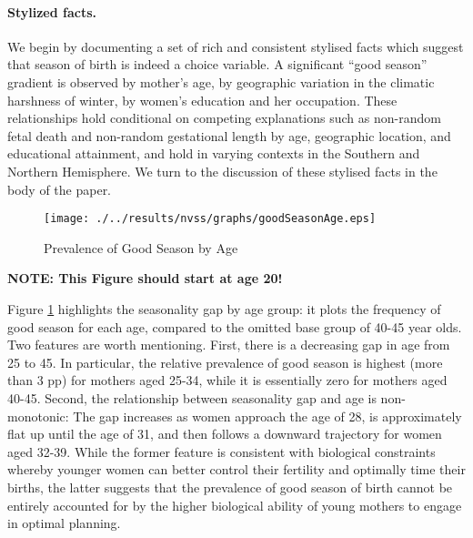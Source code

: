 \documentclass[a4paper, 12 pt]{article}
\theoremstyle{plain}
\begin{document}
\begin{doublespace}
\paragraph{Stylized facts.} We begin by documenting a set of rich and consistent stylised facts which suggest that season of birth is indeed a choice variable.  A significant ``good season'' gradient is observed by mother's age, by geographic variation in the climatic harshness of winter, by women's education and her occupation.  These relationships hold conditional on competing explanations such as non-random fetal death and non-random gestational length by age, geographic location, and educational attainment, and hold in varying contexts in the Southern and Northern Hemisphere.  We turn to the discussion of these stylised facts in the body of the paper.


\begin{figure}[htpb!]
\begin{center}
  \centering
  \caption{Prevalence of Good Season by Age}
  \texttt{[image: ./../results/nvss/graphs/goodSeasonAge.eps]}
  \label{fig:goodByAge}
\end{center}
\vspace{-5mm}
\end{figure}


\textbf{NOTE: This Figure should start at age 20!}

Figure \ref{fig:goodByAge} highlights the seasonality gap by age group: it plots the frequency of good season for each age, compared to the omitted base group of 40-45 year olds.  Two features are worth mentioning. First, there is a decreasing gap in age from 25 to 45. In particular, the relative prevalence of good season is highest (more than 3 pp) for mothers aged 25-34, while it is essentially zero for mothers aged 40-45. Second, the relationship between seasonality gap and age is non-monotonic: The gap increases as women approach the age of 28, is approximately flat up until the age of 31, and then follows a downward trajectory for women aged 32-39. While the former feature is consistent with biological constraints whereby younger women can better control their fertility and optimally time their births, the latter suggests that the prevalence of good season of birth cannot be entirely accounted for by the higher biological ability of young mothers to engage in optimal planning.



\end{doublespace}
\end{document}
